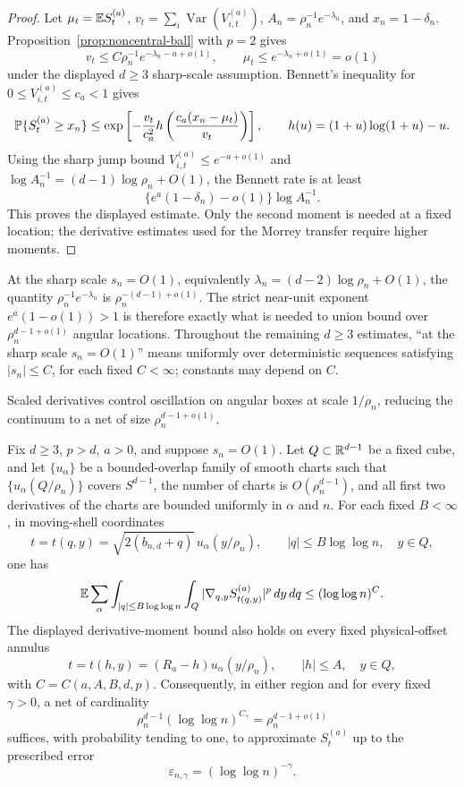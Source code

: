 \begin{proof}
Let \(\mu_t=\mathbb E S_t^{(a)}\), \(v_t=\sum_i\operatorname{Var}(V_{i,t}^{(a)})\),
\(A_n=\rho_n^{-1}e^{-\lambda_n}\), and \(x_n=1-\delta_n\).
Proposition~\ref{prop:noncentral-ball} with \(p=2\) gives
\[
    v_t\le C\rho_n^{-1}e^{-\lambda_n-a+o(1)},
    \qquad
    \mu_t\le e^{-\lambda_n+o(1)}=o(1)
\]
under the displayed \(d\ge3\) sharp-scale assumption.  Bennett's inequality for
\(0\le V_{i,t}^{(a)}\le c_a<1\) gives
\[
    \mathbb P\{S_t^{(a)}\ge x_n\}
    \le
    \exp\left[
        -\frac{v_t}{c_a^2}
        h\left(\frac{c_a(x_n-\mu_t)}{v_t}\right)
    \right],
    \qquad h(u)=(1+u)\log(1+u)-u .
\]
Using the sharp jump bound \(V_{i,t}^{(a)}\le e^{-a+o(1)}\) and
\(\log A_n^{-1}=(d-1)\log\rho_n+O(1)\), the Bennett rate is at least
\[
    \{e^a(1-\delta_n)-o(1)\}\log A_n^{-1}.
\]
This proves the displayed estimate. Only the second moment is needed at a
fixed location; the derivative estimates used for the Morrey transfer require
higher moments.
\end{proof}

At the sharp scale \(s_n=O(1)\), equivalently
\(\lambda_n=(d-2)\log\rho_n+O(1)\), the quantity
\(\rho_n^{-1}e^{-\lambda_n}\) is \(\rho_n^{-(d-1)+o(1)}\).  The strict
near-unit exponent \(e^a(1-o(1))>1\) is therefore exactly what is needed to
union bound over \(\rho_n^{d-1+o(1)}\) angular locations.
Throughout the remaining \(d\ge3\) estimates, ``at the sharp scale
\(s_n=O(1)\)'' means uniformly over deterministic sequences satisfying
\(|s_n|\le C\), for each fixed \(C<\infty\); constants may depend on \(C\).

Scaled derivatives control oscillation on angular boxes at scale
\(1/\rho_n\), reducing the continuum to a net of size
\(\rho_n^{d-1+o(1)}\).
\begin{lemma}
\label{lem:scaled-derivative-morrey}
Fix \(d\ge3\), \(p>d\), \(a>0\), and suppose \(s_n=O(1)\).
Let \(Q\subset\mathbb R^{d-1}\) be a fixed cube, and let
\(\{u_\alpha\}\) be a bounded-overlap family of smooth charts such that
\(\{u_\alpha(Q/\rho_n)\}\) covers \(S^{d-1}\), the number of charts is
\(O(\rho_n^{d-1})\), and all first two derivatives of the charts are
bounded uniformly in \(\alpha\) and \(n\).  For each fixed \(B<\infty\), in
moving-shell coordinates
\[
    t=t(q,y)=\sqrt{2(b_{n,d}+q)}\,u_\alpha(y/\rho_n),
    \qquad |q|\le B\log\log n,\quad y\in Q,
\]
one has
\[
    \mathbb E\sum_\alpha\int_{|q|\le B\log\log n}\int_Q
    |\nabla_{q,y}S_{t(q,y)}^{(a)}|^p\,dy\,dq
    \le(\log\log n)^C .
\]
The displayed derivative-moment bound also holds on every fixed physical-offset annulus
\[
    t=t(h,y)=(R_a-h)u_\alpha(y/\rho_n),
    \qquad |h|\le A,\quad y\in Q,
\]
with \(C=C(a,A,B,d,p)\). Consequently, in either region and for every fixed
\(\gamma>0\), a net of cardinality
\[
    \rho_n^{d-1}(\log\log n)^{C_\gamma}=\rho_n^{d-1+o(1)}
\]
suffices, with probability tending to one, to approximate \(S_t^{(a)}\)
up to the prescribed error
\[
    \varepsilon_{n,\gamma}=(\log\log n)^{-\gamma}.
\]
\end{lemma}

